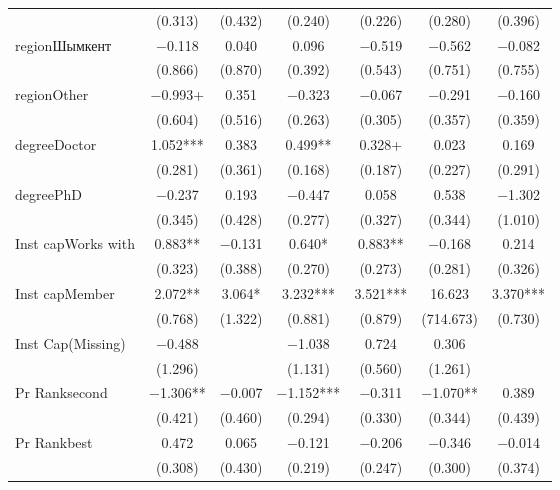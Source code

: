 \begin{table}
\begin{tabular}[t]{lcccccc}
 & (\num{0.313}) & (\num{0.432}) & (\num{0.240}) & (\num{0.226}) & (\num{0.280}) & (\num{0.396})\\
regionШымкент & \num{-0.118} & \num{0.040} & \num{0.096} & \num{-0.519} & \num{-0.562} & \num{-0.082}\\
 & (\num{0.866}) & (\num{0.870}) & (\num{0.392}) & (\num{0.543}) & (\num{0.751}) & (\num{0.755})\\
regionOther & \num{-0.993}+ & \num{0.351} & \num{-0.323} & \num{-0.067} & \num{-0.291} & \num{-0.160}\\
 & (\num{0.604}) & (\num{0.516}) & (\num{0.263}) & (\num{0.305}) & (\num{0.357}) & (\num{0.359})\\
degreeDoctor & \num{1.052}*** & \num{0.383} & \num{0.499}** & \num{0.328}+ & \num{0.023} & \num{0.169}\\
 & (\num{0.281}) & (\num{0.361}) & (\num{0.168}) & (\num{0.187}) & (\num{0.227}) & (\num{0.291})\\
degreePhD & \num{-0.237} & \num{0.193} & \num{-0.447} & \num{0.058} & \num{0.538} & \num{-1.302}\\
 & (\num{0.345}) & (\num{0.428}) & (\num{0.277}) & (\num{0.327}) & (\num{0.344}) & (\num{1.010})\\
Inst capWorks with & \num{0.883}** & \num{-0.131} & \num{0.640}* & \num{0.883}** & \num{-0.168} & \num{0.214}\\
 & (\num{0.323}) & (\num{0.388}) & (\num{0.270}) & (\num{0.273}) & (\num{0.281}) & (\num{0.326})\\
Inst capMember & \num{2.072}** & \num{3.064}* & \num{3.232}*** & \num{3.521}*** & \num{16.623} & \num{3.370}***\\
 & (\num{0.768}) & (\num{1.322}) & (\num{0.881}) & (\num{0.879}) & (\num{714.673}) & (\num{0.730})\\
Inst Cap(Missing) & \num{-0.488} &  & \num{-1.038} & \num{0.724} & \num{0.306} & \\
 & (\num{1.296}) &  & (\num{1.131}) & (\num{0.560}) & (\num{1.261}) & \\
Pr Ranksecond & \num{-1.306}** & \num{-0.007} & \num{-1.152}*** & \num{-0.311} & \num{-1.070}** & \num{0.389}\\
 & (\num{0.421}) & (\num{0.460}) & (\num{0.294}) & (\num{0.330}) & (\num{0.344}) & (\num{0.439})\\
Pr Rankbest & \num{0.472} & \num{0.065} & \num{-0.121} & \num{-0.206} & \num{-0.346} & \num{-0.014}\\
 & (\num{0.308}) & (\num{0.430}) & (\num{0.219}) & (\num{0.247}) & (\num{0.300}) & (\num{0.374})\\

\end{tabular}
\end{table}
